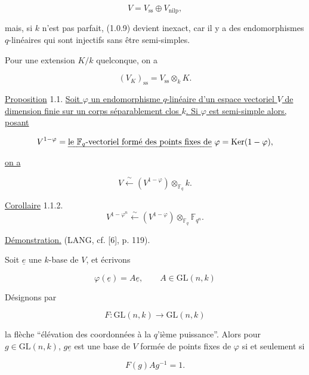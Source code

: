\begin{equation}\tag{1.0.9}
V=V_{\mathrm{ss}}\oplus V_{\mathrm{nilp}},
\end{equation}

mais, si $k$ n'est pas parfait, (1.0.9) devient inexact, car il y a des
endomorphismes $q$-linéaires qui sont injectifs sans être semi-simples.

Pour une extension $K/k$ quelconque, on a

\begin{equation}\tag{1.0.10}
(V_K)_{\mathrm{ss}}=V_{\mathrm{ss}}\otimes_k K.
\end{equation}

\underline{Proposition} 1.1. \underline{Soit $\varphi$ un endomorphisme
$q$-linéaire d'un espace vectoriel $V$ de dimension finie sur un corps
séparablement clos $k$. Si $\varphi$ est semi-simple alors, posant}

\[
V^{1-\varphi}=\text{\underline{le $\mathbb F_q$-vectoriel formé des points fixes de}
$\varphi$}=\Ker(1-\varphi),
\]

\underline{on a}

\begin{equation}\tag{1.1.1}
V\xleftarrow{\ \sim\ }
(V^{1-\varphi})\otimes_{\mathbb F_q}k.
\end{equation}


\underline{Corollaire} 1.1.2.
\[
V^{1-\varphi^n}\xleftarrow{\ \sim\ }
(V^{1-\varphi})\otimes_{\mathbb F_q}\mathbb F_{q^n}.
\]

\underline{Démonstration.} (LANG, cf. [6], p. 119).

Soit $\underline{e}$ une $k$-base de $V$, et écrivons

\begin{equation}\tag{1.1.3}
\varphi(\underline{e})=A\underline{e},\qquad A\in\mathrm{GL}(n,k)
\end{equation}

Désignons par

\begin{equation}\tag{1.1.4}
F:\mathrm{GL}(n,k)\longrightarrow\mathrm{GL}(n,k)
\end{equation}

la flèche ``élévation des coordonnées à la $q$'ième puissance''. Alors pour
$g\in\mathrm{GL}(n,k)$, $g\underline{e}$ est une base de $V$ formée de points fixes de
$\varphi$ si et seulement si

\begin{equation}\tag{1.1.5}
F(g)Ag^{-1}=1.
\end{equation}

